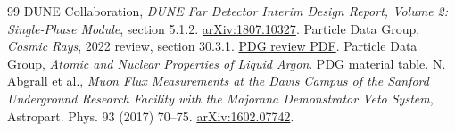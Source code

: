 \documentclass[11pt]{article}
\begin{document}
\begin{thebibliography}{99}
DUNE Collaboration, \emph{DUNE Far Detector Interim Design Report,
Volume 2: Single-Phase Module}, section 5.1.2.
\href{https://arxiv.org/abs/1807.10327}{arXiv:1807.10327}.
Particle Data Group, \emph{Cosmic Rays}, 2022 review, section 30.3.1.
\href{https://pdg.lbl.gov/2022/reviews/rpp2022-rev-cosmic-rays.pdf}{PDG review PDF}.
Particle Data Group, \emph{Atomic and Nuclear Properties of Liquid Argon}.
\href{https://pdg.lbl.gov/2017/AtomicNuclearProperties/HTML/liquid_argon.html}{PDG material table}.
N. Abgrall et al., \emph{Muon Flux Measurements at the Davis Campus of the
Sanford Underground Research Facility with the Majorana Demonstrator Veto
System}, Astropart. Phys. 93 (2017) 70--75.
\href{https://arxiv.org/abs/1602.07742}{arXiv:1602.07742}.
\end{thebibliography}
\end{document}
